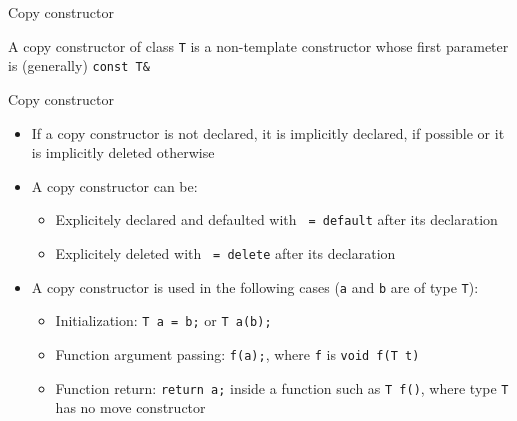 \begin{frame}{Copy constructor}{}
  \begin{definition}
    A copy constructor of class \lstinline!T! is a non-template constructor whose first parameter is (generally) \lstinline!const T&!
  \end{definition}

  \begin{block}{Copy constructor}
    \begin{itemize}
    \item
      If a copy constructor is not declared, it is implicitly declared, if possible or it is implicitly deleted otherwise
    \item
      A copy constructor can be:
      \begin{itemize}
      \item
        Explicitely declared and defaulted with \lstinline! = default! after its declaration
      \item
        Explicitely deleted with \lstinline! = delete! after its declaration
      \end{itemize}
    \item
      A copy constructor is used in the following cases (\lstinline!a! and \lstinline!b! are of type \lstinline!T!):
      \begin{itemize}
      \item
        Initialization: \lstinline!T a = b;! or \lstinline!T a(b);!
      \item
        Function argument passing: \lstinline!f(a);!, where \lstinline!f! is \lstinline!void f(T t)!
      \item
        Function return: \lstinline!return a;! inside a function such as \lstinline!T f()!, where type \lstinline!T! has no move constructor
      \end{itemize}
    \end{itemize}
  \end{block}
\end{frame}


